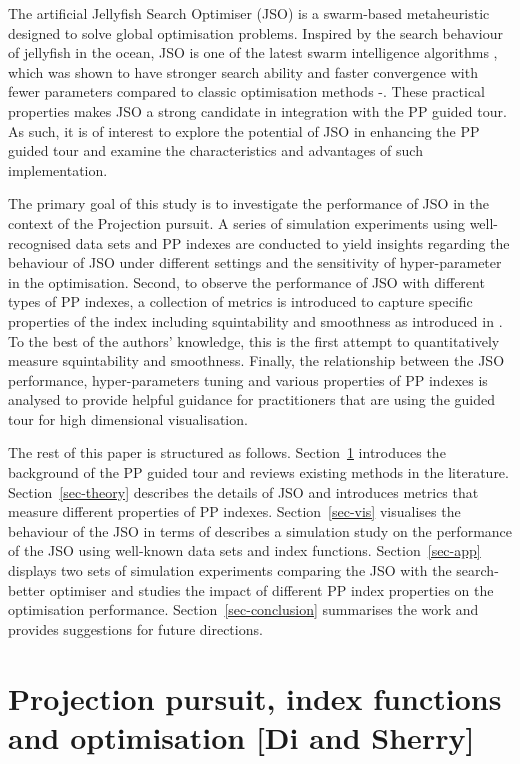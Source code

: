 \documentclass[
  number,
  preprint,
  3p]{elsarticle}
\begin{document}
The artificial Jellyfish Search Optimiser (JSO) \citep{chou_novel_2021}
is a swarm-based metaheuristic designed to solve global optimisation
problems. Inspired by the search behaviour of jellyfish in the ocean,
JSO is one of the latest swarm intelligence algorithms
\citep{rajwar_exhaustive_2023}, which was shown to have stronger search
ability and faster convergence with fewer parameters compared to classic
optimisation methods \citep{chou_novel_2021}-\citep{chou_recent_2022}.
These practical properties makes JSO a strong candidate in integration
with the PP guided tour. As such, it is of interest to explore the
potential of JSO in enhancing the PP guided tour and examine the
characteristics and advantages of such implementation.

The primary goal of this study is to investigate the performance of JSO
in the context of the Projection pursuit. A series of simulation
experiments using well-recognised data sets and PP indexes are conducted
to yield insights regarding the behaviour of JSO under different
settings and the sensitivity of hyper-parameter in the optimisation.
Second, to observe the performance of JSO with different types of PP
indexes, a collection of metrics is introduced to capture specific
properties of the index including squintability and smoothness as
introduced in \citet{laa_using_2020}. To the best of the authors'
knowledge, this is the first attempt to quantitatively measure
squintability and smoothness. Finally, the relationship between the JSO
performance, hyper-parameters tuning and various properties of PP
indexes is analysed to provide helpful guidance for practitioners that
are using the guided tour for high dimensional visualisation.

The rest of this paper is structured as follows.
Section~\ref{sec-background} introduces the background of the PP guided
tour and reviews existing methods in the literature.
Section~\ref{sec-theory} describes the details of JSO and introduces
metrics that measure different properties of PP indexes.
Section~\ref{sec-vis} visualises the behaviour of the JSO in terms of
describes a simulation study on the performance of the JSO using
well-known data sets and index functions. Section~\ref{sec-app} displays
two sets of simulation experiments comparing the JSO with the
search-better optimiser and studies the impact of different PP index
properties on the optimisation performance. Section~\ref{sec-conclusion}
summarises the work and provides suggestions for future directions.

\section{Projection pursuit, index functions and optimisation {[}Di and
Sherry{]}}\label{sec-background}
\end{document}
